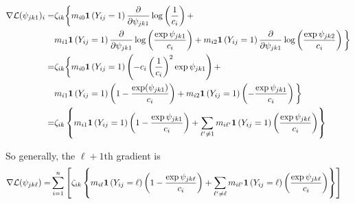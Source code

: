 \documentclass[11pt]{article}
\begin{document}
\begin{appendices}
\begin{align*}
\nabla\mathcal{L}({\psi}_{jk1})_i =& \zeta_{ik}\bigg\{m_{i0}\bm{1}\left(Y_{ij} = 1\right)\frac{\partial}{\partial \psi_{jk1}} \log\left(\frac{1}{c_i}\right) + \\
~~& m_{i1}\bm{1}\left(Y_{ij} = 1\right)\frac{\partial}{\partial \psi_{jk1}}\log\left(\frac{\exp{\psi_{jk1}}}{c_i}\right) + m_{i2}\bm{1}\left(Y_{ij} = 1\right)\frac{\partial}{\partial \psi_{jk1}}\log\left(\frac{\exp{\psi_{jk2}}}{c_i}\right)\bigg\}\\
=& \zeta_{ik}\bigg\{m_{i0}\bm{1}\left(Y_{ij} = 1\right)\left(-c_i\left(\frac{1}{c_i}\right)^2\exp{\psi_{jk1}}\right) + \\
~~& m_{i1}\bm{1}\left(Y_{ij} = 1\right)\left(1 - \frac{\exp(\psi_{jk1})}{c_i}\right) + m_{i2}\bm{1}\left(Y_{ij} = 1\right)\left(- \frac{\exp{\psi_{jk1}}}{c_i}\right)\bigg\}\\
=& \zeta_{ik}\left\{m_{i1}\bm{1}\left(Y_{ij} = 1\right)\left(1 - \frac{\exp{\psi_{jk1}}}{c_i}\right) + \sum_{\ell^\prime \neq 1}m_{i\ell^\prime}\bm{1}\left(Y_{ij} = 1\right)\left(\frac{\exp{\psi_{jk\ell}}}{c_i}\right)\right\}\\
\end{align*}

So generally, the $\ell + 1$th gradient is
\begin{align*}
\nabla\mathcal{L}({\psi}_{jk\ell}) =& \sum^{n}_{i=1}\left[\zeta_{ik}\left\{m_{i\ell}\bm{1}\left(Y_{ij} = \ell\right)\left(1 - \frac{\exp{\psi_{jk\ell}}}{c_i}\right) + \sum_{\ell^\prime \neq \ell}m_{i\ell^\prime}\bm{1}\left(Y_{ij} = \ell\right)\left(\frac{\exp{\psi_{jk\ell}}}{c_i}\right)\right\}\right]
\end{align*}

\end{appendices}
\end{document}
